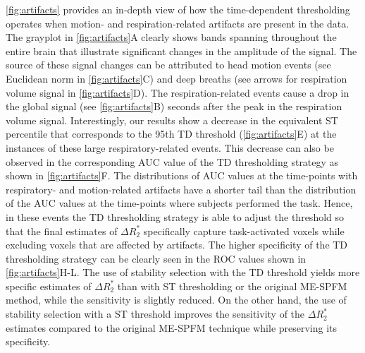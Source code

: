 \cref{fig:artifacts} provides an in-depth view of how the time-dependent
thresholding operates when motion- and respiration-related artifacts are present
in the data. The grayplot \citep{Power2017simpleusefulway} in
\cref{fig:artifacts}A clearly shows bands spanning throughout the entire brain
that illustrate significant changes in the amplitude of the signal. The source
of these signal changes can be attributed to head motion events (see Euclidean
norm in \cref{fig:artifacts}C) and deep breaths (see arrows for respiration
volume signal \citep{Chang2009Influenceheartrate} in \cref{fig:artifacts}D). The
respiration-related events cause a drop in the global signal (see
\cref{fig:artifacts}B) seconds after the peak in the respiration volume signal.
Interestingly, our results show a decrease in the equivalent ST percentile that
corresponds to the 95th TD threshold (\cref{fig:artifacts}E) at the instances of
these large respiratory-related events. This decrease can also be observed in
the corresponding AUC value of the TD thresholding strategy as shown in
\cref{fig:artifacts}F. The distributions of AUC values at the time-points with
respiratory- and motion-related artifacts have a shorter tail than the
distribution of the AUC values at the time-points where subjects performed the
task. Hence, in these events the TD thresholding strategy is able to adjust the
threshold so that the final estimates of $\Delta R_2^*$ specifically capture
task-activated voxels while excluding voxels that are affected by artifacts. The
higher specificity of the TD thresholding strategy can be clearly seen in the
ROC values shown in \cref{fig:artifacts}H-L. The use of stability
selection with the TD threshold yields more specific estimates of $\Delta R_2^*$
than with ST thresholding or the original ME-SPFM method, while the sensitivity
is slightly reduced. On the other hand, the use of stability selection with a ST
threshold improves the sensitivity of the $\Delta R_2^*$ estimates compared to
the original ME-SPFM technique while preserving its specificity.

